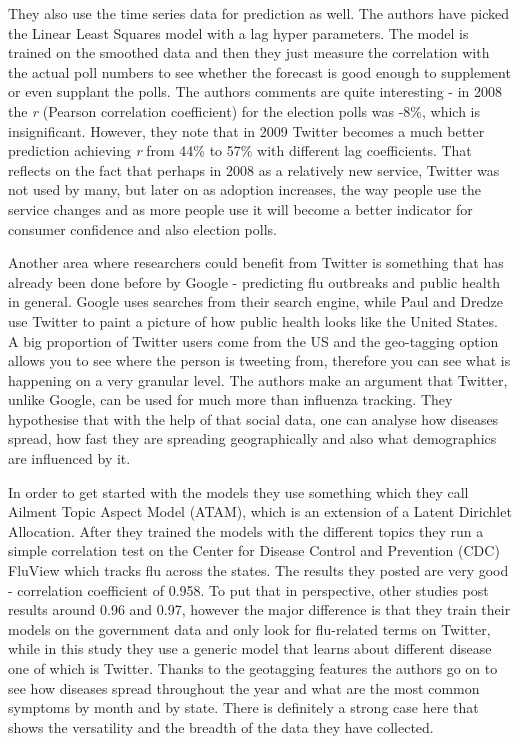 \documentclass[minf,twoside,singlespacing,parskip,frontabs,notimes,12pt]{infthesis} %
\begin{document}
They also use the time series data for prediction as well. 
The authors have picked the Linear Least Squares model with a lag hyper parameters. 
The model is trained on the smoothed data and then they just measure the correlation with the actual poll numbers to see whether the forecast is good enough to supplement or even supplant the polls. 
The authors comments are quite interesting - in 2008 the \textit{r} (Pearson correlation coefficient) for the election polls was -8\%, which is insignificant. 
However, they note that in 2009 Twitter becomes a much better prediction achieving \textit{r} from 44\% to 57\% with different lag coefficients. 
That reflects on the fact that perhaps in 2008 as a relatively new service, Twitter was not used by many, but later on as adoption increases, the way people use the service changes and as more people use it will become a better indicator for consumer confidence and also election polls. 

Another area where researchers could benefit from Twitter is something that has already been done before by Google - predicting flu outbreaks and public health in general. 
Google uses searches from their search engine, while Paul and Dredze\cite{twitflu} use Twitter to paint a picture of how public health looks like the United States. 
A big proportion of Twitter users come from the US and the geo-tagging option allows you to see where the person is tweeting from, therefore you can see what is happening on a very granular level. 
The authors make an argument that Twitter, unlike Google, can be used for much more than influenza tracking. 
They hypothesise that with the help of that social data, one can analyse how diseases spread, how fast they are spreading geographically and also what demographics are influenced by it.


In order to get started with the models they use something which they call Ailment Topic Aspect Model (ATAM), which is an extension of a Latent Dirichlet Allocation\cite{lda}. 
After they trained the models with the different topics they run a simple correlation test on the Center for Disease Control and Prevention (CDC) FluView which tracks flu across the states. 
The results they posted are very good - correlation coefficient of 0.958. 
To put that in perspective, other studies post results around 0.96 and 0.97, however the major difference is that they train their models on the government data and only look for flu-related terms on Twitter, while in this study they use a generic model that learns about different disease one of which is Twitter. 
Thanks to the geotagging features the authors go on to see how diseases spread throughout the year and what are the most common symptoms by month and by state. 
There is definitely a strong case here that shows the versatility and the breadth of the data they have collected. 
\end{document}
